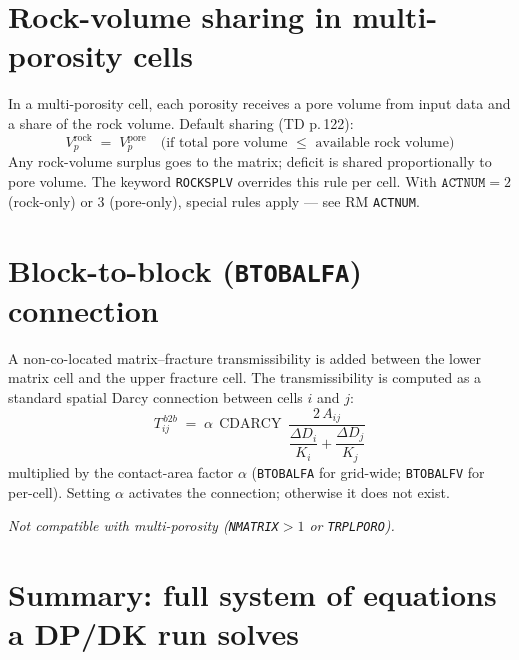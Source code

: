 \documentclass[11pt,a4paper]{article}
\newcommand{\kw}[1]{\texttt{#1}}
\newcommand{\note}[1]{\par\smallskip\textit{#1}\par\smallskip}
\DeclareMathOperator{\CDARCY}{CDARCY}
\begin{document}
\section{Rock-volume sharing in multi-porosity cells}
In a multi-porosity cell, each porosity receives a pore volume from input data and a share of the
rock volume. Default sharing (TD p.\,122):
\begin{equation}
V^{\text{rock}}_p \;=\; V^{\text{pore}}_p
\quad\text{(if total pore volume } \le \text{ available rock volume)}
\label{eq:rock-share}
\end{equation}
Any rock-volume surplus goes to the matrix; deficit is shared proportionally to pore volume.
The keyword \kw{ROCKSPLV} overrides this rule per cell. With $\kw{ACTNUM}=2$ (rock-only) or $3$ (pore-only), special rules apply — see RM \kw{ACTNUM}.

\section{Block-to-block (\kw{BTOBALFA}) connection}
A non-co-located matrix--fracture transmissibility is added between the lower matrix cell and the upper fracture cell.
The transmissibility is computed as a standard spatial Darcy connection between cells $i$ and $j$:
\begin{equation}
T^{\,b2b}_{ij} \;=\; \alpha\,\CDARCY\,\frac{2\,A_{ij}}{\dfrac{\Delta D_i}{K_i} + \dfrac{\Delta D_j}{K_j}}
\label{eq:btob}
\end{equation}
multiplied by the contact-area factor $\alpha$ (\kw{BTOBALFA} for grid-wide; \kw{BTOBALFV} for per-cell).
Setting $\alpha$ activates the connection; otherwise it does not exist.
\note{Not compatible with multi-porosity (\kw{NMATRIX}$>1$ or \kw{TRPLPORO}).}

\section{Summary: full system of equations a DP/DK run solves}
\end{document}
